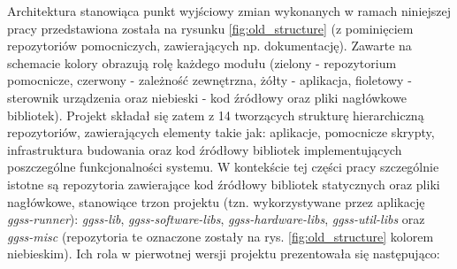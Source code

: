 Architektura stanowiąca punkt wyjściowy zmian wykonanych w ramach niniejszej pracy przedstawiona została na rysunku \ref{fig:old_structure} (z pominięciem repozytoriów pomocniczych, zawierających np. dokumentację). Zawarte na schemacie kolory obrazują rolę każdego modułu (zielony - repozytorium pomocnicze, czerwony - zależność zewnętrzna, żółty - aplikacja, fioletowy - sterownik urządzenia oraz niebieski - kod źródłowy oraz pliki nagłówkowe bibliotek). Projekt składał się zatem z 14 tworzących strukturę hierarchiczną repozytoriów, zawierających elementy takie jak: aplikacje, pomocnicze skrypty, infrastruktura budowania oraz kod źródłowy bibliotek implementujących poszczególne funkcjonalności systemu. W kontekście tej części pracy szczególnie istotne są repozytoria zawierające kod źródłowy bibliotek statycznych oraz pliki nagłówkowe, stanowiące trzon projektu (tzn. wykorzystywane przez aplikację \emph{ggss-runner}): \emph{ggss-lib}, \emph{ggss-software-libs}, \emph{ggss-hardware-libs}, \emph{ggss-util-libs} oraz \emph{ggss-misc} (repozytoria te oznaczone zostały na rys. \ref{fig:old_structure} kolorem niebieskim). Ich rola w pierwotnej wersji projektu prezentowała się następująco:
